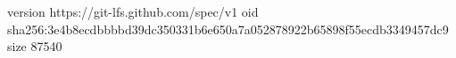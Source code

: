 version https://git-lfs.github.com/spec/v1
oid sha256:3e4b8ecdbbbbd39dc350331b6e650a7a052878922b65898f55ecdb3349457dc9
size 87540
